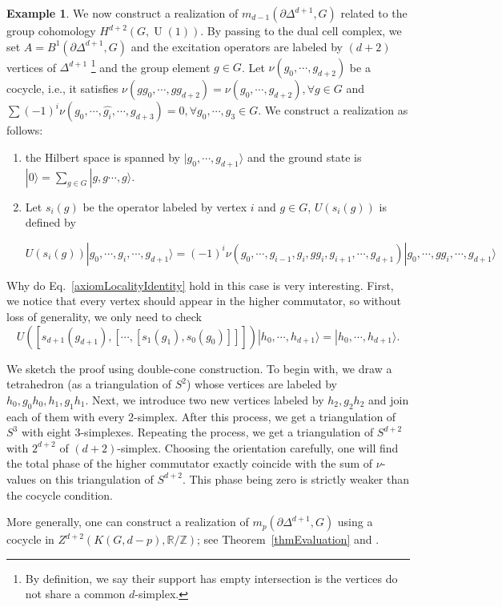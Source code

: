 \documentclass[reprint, amsmath, amssymb, showpacs, floatfix, longbibliography, aps, twocolumn, superscriptaddress, nofootinbib]{revtex4-2}
\newcommand{\ZZ}{{\mathbb Z}}
\newcommand{\RR}{{\mathbb R}}
\theoremstyle{definition}
\newtheorem{example}{Example}[section]
\begin{document}
\begin{example}\label{exampleGroupCohomology}
	We now construct a realization of $m_{d-1}(\partial\Delta^{d+1},G)$ related to the group cohomology $H^{d+2}(G,\operatorname{U}(1))$. By passing to the dual cell complex, we set $A=B^1(\partial\Delta^{d+1},G)$ and the excitation operators are labeled by $(d+2)$ vertices of $\Delta^{d+1}$ \footnote{By definition, we say their support has empty intersection is the vertices do not share a common $d$-simplex.} and the group element $g\in G$.  Let $\nu(g_0,\cdots,g_{d+2})$ be a cocycle, i.e., it satisfies $\nu(gg_0,\cdots,gg_{d+2})=\nu(g_0,\cdots,g_{d+2}),\forall g\in G$ and $\sum (-1)^i \nu(g_0,\cdots,\hat{g_i},\cdots,g_{d+3})=0,\forall g_0,\cdots,g_3\in G$. We construct a realization as follows:
	\begin{widetext}
	\begin{enumerate}
		\item the Hilbert space is spanned by $|g_0,\cdots,g_{d+1}\rangle$ and the ground state is $|0\rangle=\sum_{g\in G}|g,g\cdots ,g\rangle$.
		\item Let $s_i(g)$ be the operator labeled by vertex $i$ and $g\in G$, $ U(s_i(g))$ is defined by
		
				\begin{equation}
				 U(s_i(g))|g_0,\cdots ,g_{i},\cdots,g_{d+1}\rangle=(-1)^i\nu(g_0,\cdots,g_{i-1},g_i,gg_i,g_{i+1},\cdots,g_{d+1})|g_0,\cdots ,gg_{i},\cdots,g_{d+1}\rangle
			\end{equation}
		
	
		
		
		
	\end{enumerate}
	
	Why do Eq.~\eqref{axiomLocalityIdentity} hold in this case is very interesting. First, we notice that every vertex should appear in the higher commutator, so without loss of generality, we only need to check
	\begin{equation}
		 U([s_{d+1}(g_{d+1}),[\cdots,[s_1(g_1),s_0(g_0)]]])|h_0,\cdots,h_{d+1}\rangle=|h_0,\cdots,h_{d+1}\rangle.
	\end{equation}
\end{widetext}
	We sketch the proof using double-cone construction. To begin with, we draw a tetrahedron (as a triangulation of $S^2$) whose vertices are labeled by $h_0,g_0h_0,h_1,g_1h_1$. Next, we introduce two new vertices labeled by $h_2,g_2h_2$ and join each of them with every $2$-simplex. After this process, we get a triangulation of $S^3$ with eight $3$-simplexes. Repeating the process, we get a triangulation of $S^{d+2}$ with $2^{d+2}$ of $(d+2)$-simplex. Choosing the orientation carefully, one will find the total phase of the higher commutator exactly coincide with the sum of $\nu$-values on this triangulation of $S^{d+2}$. This phase being zero is strictly weaker than the cocycle condition. 
	
	More generally, one can construct a realization of $m_p(\partial\Delta^{d+1},G)$ using a cocycle in $Z^{d+2}(K(G,d-p),\RR/\ZZ)$; see Theorem~\ref{thmEvaluation} and \cite{feng2025anyonicmembranespontryaginstatistics}.
\end{example}
\end{document}
